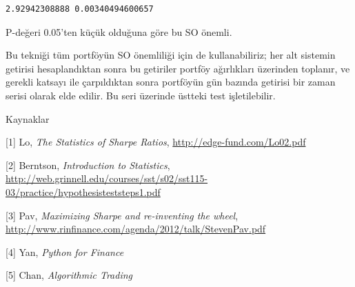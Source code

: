 \documentclass[12pt,fleqn]{article}\usepackage{../../common}
\begin{document}
\begin{verbatim}
2.92942308888 0.00340494600657
\end{verbatim}

P-değeri 0.05'ten küçük olduğuna göre bu SO önemli.

Bu tekniği tüm portföyün SO önemliliği için de kullanabiliriz; her alt sistemin
getirisi hesaplandıktan sonra bu getiriler portföy ağırlıkları üzerinden
toplanır, ve gerekli katsayı ile çarpıldıktan sonra portföyün gün bazında
getirisi bir zaman serisi olarak elde edilir. Bu seri üzerinde üstteki test
işletilebilir. 

Kaynaklar

[1] Lo, {\em The Statistics of Sharpe Ratios}, \url{http://edge-fund.com/Lo02.pdf}

[2] Berntson, {\em Introduction to Statistics}, \url{http://web.grinnell.edu/courses/sst/s02/sst115-03/practice/hypothesisteststeps1.pdf}

[3] Pav, {\em Maximizing Sharpe and re-inventing the wheel}, \url{http://www.rinfinance.com/agenda/2012/talk/StevenPav.pdf}

[4] Yan, {\em Python for Finance}

[5] Chan, {\em Algorithmic Trading}
\end{document}
